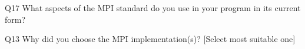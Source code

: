 \begin{description}%
\item{Q17} What aspects of the MPI standard do you use in your program in its current form?%
\item{Q13} Why did you choose the MPI implementation(s)? [Select most suitable one]%
\end{description}%
